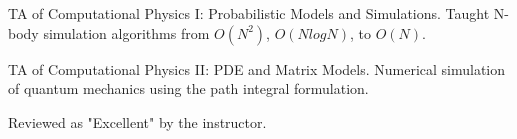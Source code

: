\documentclass[letter,12pt]{article}
\begin{document}
\begin{zitemize}
\item TA of Computational Physics I: Probabilistic Models and Simulations. \newline
Taught N-body simulation algorithms from $O(N^2)$, $O(NlogN)$, to $O(N)$.
\item TA of Computational Physics II: PDE and Matrix Models. \newline
Numerical simulation of quantum mechanics using the path integral formulation.
\item Reviewed as "Excellent" by the instructor.
\end{zitemize}
\end{document}
